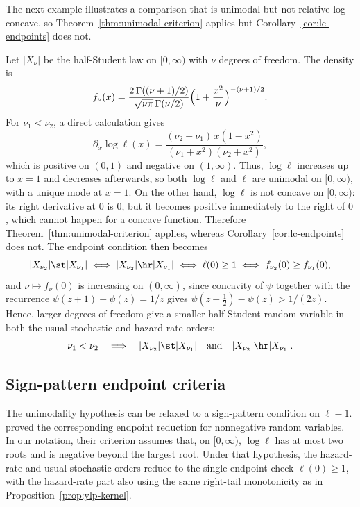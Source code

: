 \documentclass[11pt]{article}
\begin{document}
The next example illustrates a comparison that is unimodal but not relative-log-concave, so Theorem~\ref{thm:unimodal-criterion} applies but Corollary~\ref{cor:lc-endpoints} does not.

\begin{example}
\label{ex:half-student}
Let $|X_\nu|$ be the half-Student law on $[0,\infty)$ with $\nu$ degrees of freedom. The density is
\[
f_\nu(x)=\frac{2\,\Gamma((\nu+1)/2)}{\sqrt{\nu\pi}\,\Gamma(\nu/2)}\Bigl(1+\frac{x^2}{\nu}\Bigr)^{-(\nu+1)/2}.
\]
For $\nu_1<\nu_2$, a direct calculation gives
\[
\partial_x\log\ell(x) =\frac{(\nu_2-\nu_1)\,x(1-x^2)}{(\nu_1+x^2)(\nu_2+x^2)},
\]
which is positive on $(0,1)$ and negative on $(1,\infty)$. Thus, $\log\ell$ increases up to $x=1$ and decreases afterwards, so both $\log\ell$ and $\ell$ are unimodal on $[0,\infty)$, with a unique mode at $x=1$. On the other hand, $\log\ell$ is not concave on $[0,\infty)$: its right derivative at $0$ is $0$, but it becomes positive immediately to the right of $0$, which cannot happen for a concave function. Therefore Theorem~\ref{thm:unimodal-criterion} applies, whereas Corollary~\ref{cor:lc-endpoints} does not. The endpoint condition then becomes
\[
|X_{\nu_2}|\st|X_{\nu_1}|\iff |X_{\nu_2}|\hr|X_{\nu_1}|\iff \ell(0)\ge 1\iff f_{\nu_2}(0)\ge f_{\nu_1}(0),
\]
and $\nu\mapsto f_\nu(0)$ is increasing on $(0,\infty)$, since concavity of $\psi$ together with the recurrence $\psi(z+1)-\psi(z)=1/z$ gives $\psi(z+\tfrac{1}{2})-\psi(z)>1/(2z)$. Hence, larger degrees of freedom give a smaller half-Student random variable in both the usual stochastic and hazard-rate orders:
\[
\nu_1<\nu_2 \quad\Longrightarrow\quad |X_{\nu_2}|\st|X_{\nu_1}|
\quad\text{and}\quad
|X_{\nu_2}|\hr|X_{\nu_1}|.
\]
\end{example}

\subsection{Sign-pattern endpoint criteria}

The unimodality hypothesis can be relaxed to a sign-pattern condition on \(\ell-1\). \cite{YaoLouPan2023} proved the corresponding endpoint reduction for nonnegative random variables. In our notation, their criterion assumes that, on \([0,\infty)\), \(\log \ell\) has at most two roots and is negative beyond the largest root. Under that hypothesis, the hazard-rate and usual stochastic orders reduce to the single endpoint check \(\ell(0)\ge 1\), with the hazard-rate part also using the same right-tail monotonicity as in Proposition~\ref{prop:ylp-kernel}.
\end{document}
